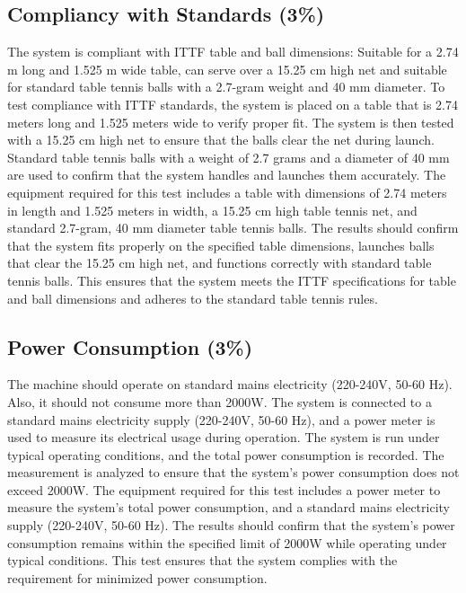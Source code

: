 \documentclass[12pt]{report}
\begin{document}
\subsection{Compliancy with Standards (3\%)}
The system is compliant with ITTF table and ball dimensions: Suitable for a 2.74 m long and 1.525 m wide table, can serve over a 15.25 cm high net and suitable for standard table tennis balls with a 2.7-gram weight and 40 mm diameter. To test compliance with ITTF standards, the system is placed on a table that is 2.74 meters long and 1.525 meters wide to verify proper fit. The system is then tested with a 15.25 cm high net to ensure that the balls clear the net during launch. Standard table tennis balls with a weight of 2.7 grams and a diameter of 40 mm are used to confirm that the system handles and launches them accurately. The equipment required for this test includes a table with dimensions of 2.74 meters in length and 1.525 meters in width, a 15.25 cm high table tennis net, and standard 2.7-gram, 40 mm diameter table tennis balls. The results should confirm that the system fits properly on the specified table dimensions, launches balls that clear the 15.25 cm high net, and functions correctly with standard table tennis balls. This ensures that the system meets the ITTF specifications for table and ball dimensions and adheres to the standard table tennis rules.

\subsection{Power Consumption (3\%)}
The machine should operate on standard mains electricity (220-240V, 50-60 Hz). Also, it should not consume more than 2000W.  The system is connected to a standard mains electricity supply (220-240V, 50-60 Hz), and a power meter is used to measure its electrical usage during operation. The system is run under typical operating conditions, and the total power consumption is recorded. The measurement is analyzed to ensure that the system’s power consumption does not exceed 2000W. The equipment required for this test includes a power meter to measure the system's total power consumption, and a standard mains electricity supply (220-240V, 50-60 Hz). The results should confirm that the system’s power consumption remains within the specified limit of 2000W while operating under typical conditions. This test ensures that the system complies with the requirement for minimized power consumption.
\end{document}

